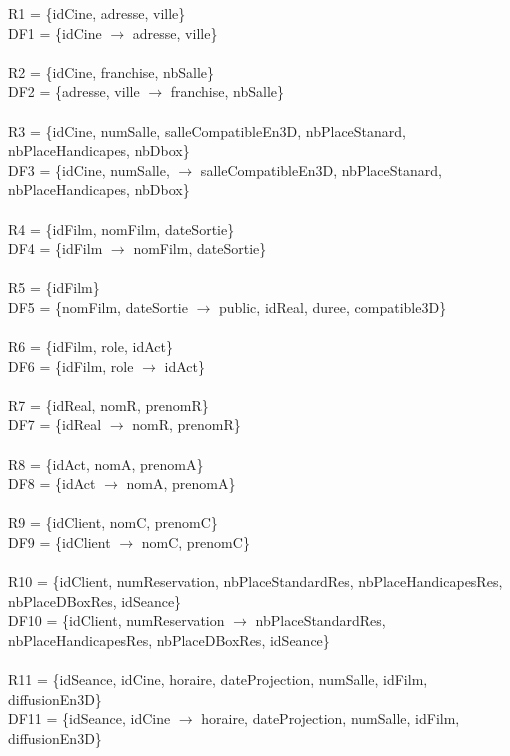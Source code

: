 \documentclass[a4paper,sffamily,12pt]{article}
\begin{document}
				\noindent R1 = \{idCine, adresse, ville\} \\  DF1 = \{idCine $\rightarrow$ adresse, ville\} \\
				\\
				R2 = \{idCine, franchise, nbSalle\} \\ DF2 = \{adresse, ville $\rightarrow$ franchise, nbSalle\} \\
				\\
				R3 = \{idCine, numSalle, salleCompatibleEn3D, nbPlaceStanard, nbPlaceHandicapes, nbDbox\} \\ DF3 = \{idCine, numSalle, $\rightarrow$ salleCompatibleEn3D, nbPlaceStanard, nbPlaceHandicapes, nbDbox\} \\
				\\
				R4 = \{idFilm, nomFilm, dateSortie\} \\ DF4 = \{idFilm $\rightarrow$ nomFilm, dateSortie\} \\
				\\
				R5 = \{idFilm\} \\ DF5 = \{nomFilm, dateSortie $\rightarrow$ public, idReal, duree, compatible3D\} \\	
				\\							
				R6 = \{idFilm, role, idAct\} \\ DF6 = \{idFilm, role $\rightarrow$  idAct\} \\
				\\
				R7 = \{idReal, nomR, prenomR\} \\ DF7 = \{idReal $\rightarrow$ nomR, prenomR\} \\
				\\
				R8 = \{idAct, nomA, prenomA\} \\ DF8 = \{idAct $\rightarrow$ nomA, prenomA\} \\
				\\
				R9 = \{idClient, nomC, prenomC\} \\ DF9 = \{idClient $\rightarrow$ nomC, prenomC\} \\ 
				\\
				R10 = \{idClient, numReservation, nbPlaceStandardRes, nbPlaceHandicapesRes, nbPlaceDBoxRes, idSeance\} \\ DF10 = \{idClient, numReservation $\rightarrow$  nbPlaceStandardRes, nbPlaceHandicapesRes, nbPlaceDBoxRes, idSeance\} \\
				\\
				R11 = \{idSeance, idCine, horaire, dateProjection, numSalle, idFilm, diffusionEn3D\} \\ DF11 = \{idSeance, idCine $\rightarrow$ horaire, dateProjection, numSalle, idFilm, diffusionEn3D\} \\
				\\
				
\end{document}
